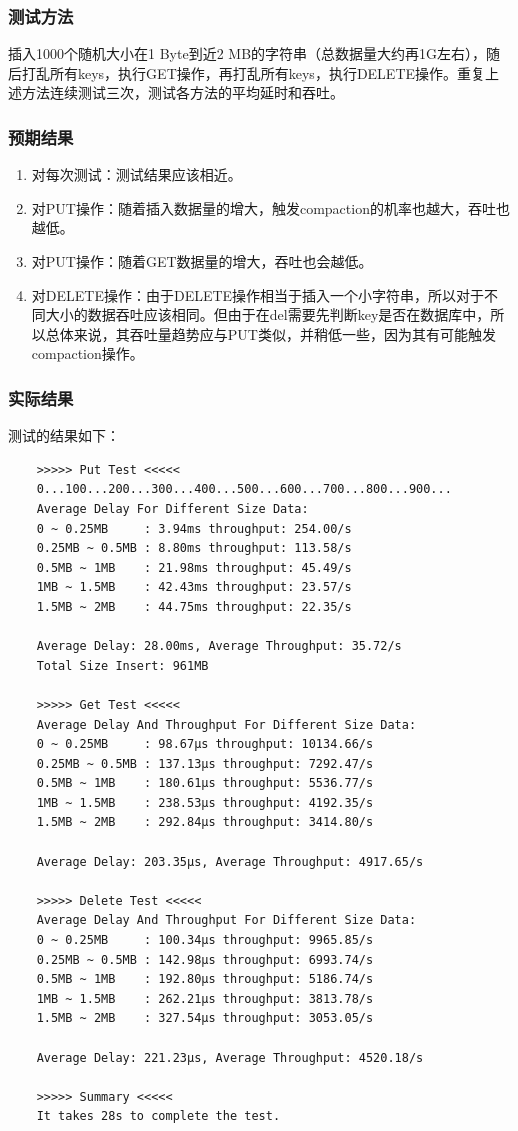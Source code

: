 \documentclass{ctexart}
\begin{document}
\subsubsection{测试方法}
插入1000个随机大小在1 Byte到近2 MB的字符串（总数据量大约再1G左右），随后打乱所有keys，执行GET操作，再打乱所有keys，执行DELETE操作。重复上述方法连续测试三次，测试各方法的平均延时和吞吐。
\subsubsection{预期结果}
\begin{enumerate}
  \item 对每次测试：测试结果应该相近。
  \item 对PUT操作：随着插入数据量的增大，触发compaction的机率也越大，吞吐也越低。
  \item 对PUT操作：随着GET数据量的增大，吞吐也会越低。
  \item 对DELETE操作：由于DELETE操作相当于插入一个小字符串，所以对于不同大小的数据吞吐应该相同。但由于在del需要先判断key是否在数据库中，所以总体来说，其吞吐量趋势应与PUT类似，并稍低一些，因为其有可能触发compaction操作。
\end{enumerate}

\subsubsection{实际结果}
测试的结果如下：
\begin{verbatim}
    >>>>> Put Test <<<<<
    0...100...200...300...400...500...600...700...800...900...
    Average Delay For Different Size Data:
    0 ~ 0.25MB     : 3.94ms throughput: 254.00/s
    0.25MB ~ 0.5MB : 8.80ms throughput: 113.58/s
    0.5MB ~ 1MB    : 21.98ms throughput: 45.49/s
    1MB ~ 1.5MB    : 42.43ms throughput: 23.57/s
    1.5MB ~ 2MB    : 44.75ms throughput: 22.35/s
    
    Average Delay: 28.00ms, Average Throughput: 35.72/s
    Total Size Insert: 961MB
    
    >>>>> Get Test <<<<<
    Average Delay And Throughput For Different Size Data:
    0 ~ 0.25MB     : 98.67µs throughput: 10134.66/s
    0.25MB ~ 0.5MB : 137.13µs throughput: 7292.47/s
    0.5MB ~ 1MB    : 180.61µs throughput: 5536.77/s
    1MB ~ 1.5MB    : 238.53µs throughput: 4192.35/s
    1.5MB ~ 2MB    : 292.84µs throughput: 3414.80/s
    
    Average Delay: 203.35µs, Average Throughput: 4917.65/s
    
    >>>>> Delete Test <<<<<
    Average Delay And Throughput For Different Size Data:
    0 ~ 0.25MB     : 100.34µs throughput: 9965.85/s
    0.25MB ~ 0.5MB : 142.98µs throughput: 6993.74/s
    0.5MB ~ 1MB    : 192.80µs throughput: 5186.74/s
    1MB ~ 1.5MB    : 262.21µs throughput: 3813.78/s
    1.5MB ~ 2MB    : 327.54µs throughput: 3053.05/s
    
    Average Delay: 221.23µs, Average Throughput: 4520.18/s
    
    >>>>> Summary <<<<<
    It takes 28s to complete the test.
\end{verbatim}
\end{document}
